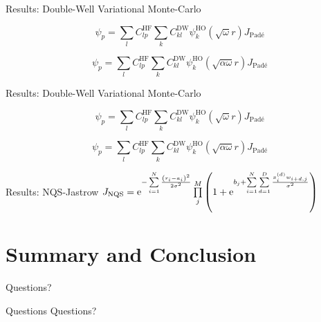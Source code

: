 \documentclass[10pt, t, xcolor=dvipsnames]{beamer}
\newcommand{\twofigure}[2]{
    \begin{figure}[H]
        \centering
        \begin{subfigure}[b!]{0.49\textwidth}
            \centering
            \texttt{[image: \{\#1]}}
        \end{subfigure}
        \begin{subfigure}[b!]{0.49\textwidth}
            \centering
            \texttt{[image: \{\#2]}}
        \end{subfigure}
        \justify
    \end{figure}
} %
\begin{document}
\begin{frame}[fragile]{Results: Double-Well Variational Monte-Carlo}
    
    \begin{equation*}
        \psi_p =
        \sum_lC^{\text{HF}}_{lp}\sum_kC^{\text{DW}}_{kl}\psi^{\text{HO}}_k\left(\sqrt{\omega}r\right)J_{\text{Pad\'e}}
    \end{equation*}
    
    \begin{equation*}
        \psi_p =
        \sum_lC^{\text{HF}}_{lp}\sum_kC^{\text{DW}}_{kl}\psi^{\text{HO}}_k\left(\sqrt{\alpha\omega}r\right)J_{\text{Pad\'e}}
    \end{equation*}
\end{frame}

\begin{frame}[fragile]{Results: Double-Well Variational Monte-Carlo}
    
    \begin{equation*}
        \psi_p =
        \sum_lC^{\text{HF}}_{lp}\sum_kC^{\text{DW}}_{kl}\psi^{\text{HO}}_k\left(\sqrt{\omega}r\right)J_{\text{Pad\'e}}
    \end{equation*}
    
    \begin{equation*}
        \psi_p =
        \sum_lC^{\text{HF}}_{lp}\sum_kC^{\text{DW}}_{kl}\psi^{\text{HO}}_k\left(\sqrt{\alpha\omega}r\right)J_{\text{Pad\'e}}
    \end{equation*}
\end{frame}

{
\begin{frame}[standout]{Results: NQS-Jastrow}
    $J_{\text{NQS}} = \me^{-\suml{i=1}{N} \frac{\left({r}_i -
    {a}_i\right)^2}{2\sigma^2}}\prod\limits^{M}_j \left(1 + \me^{b_j +
    \suml{i=1}{N}\suml{d=1}{D} \frac{x^{(d)}_iw_{i+d,j}}{\sigma^2}}\right)$
\end{frame}}


\section{Summary and Conclusion}

{
\begin{frame}[standout]
  Questions?
\end{frame}}

\appendix

{
\begin{frame}[standout]{Questions}
    Questions?
\end{frame}}
\end{document}
